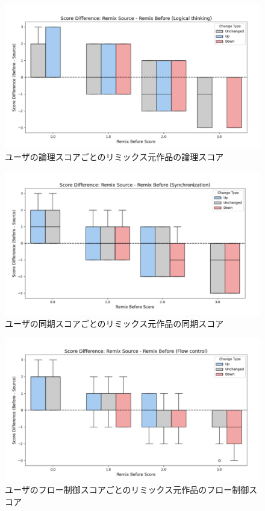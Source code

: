 \documentclass[11pt]{jreport}
\begin{document}
\begin{figure}[h]
\centerline{\includegraphics[width=0.7\linewidth]{@BSthesis2024_Horio/BSthesis2024_Horio_fig/Logicalthinking-boxplot.pdf}}
\caption{ユーザの論理スコアごとのリミックス元作品の論理スコア}
\label{fig:Logicalthinking-boxplot}
\end{figure}
\begin{figure}[h]
\centerline{\includegraphics[width=0.7\linewidth]{@BSthesis2024_Horio/BSthesis2024_Horio_fig/Synchronization-boxplot.pdf}}
\caption{ユーザの同期スコアごとのリミックス元作品の同期スコア}
\label{fig:Synchronization-boxplot}
\end{figure}
\begin{figure}[h]
\centerline{\includegraphics[width=0.7\linewidth]{@BSthesis2024_Horio/BSthesis2024_Horio_fig/Flowcontrol-boxplot.pdf}}
\caption{ユーザのフロー制御スコアごとのリミックス元作品のフロー制御スコア}
\label{fig:Flowcontrol-boxplot}
\end{figure}
\end{document}
